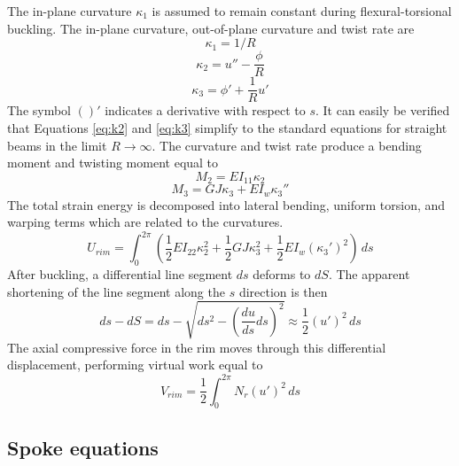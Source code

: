 \documentclass{bmd2016p}
\begin{document}
The in-plane curvature $\kappa_1$ is assumed to remain constant during flexural-torsional buckling. The in-plane curvature, out-of-plane curvature and twist rate are
	\begin{equation}\label{eq:k1}
	\kappa_1 = 1/R
	\end{equation}
	\begin{equation}\label{eq:k2}
	\kappa_2 = u'' - \frac{\phi}{R}
	\end{equation}
	\begin{equation}\label{eq:k3}
	\kappa_3 = \phi' + \frac{1}{R} u'
	\end{equation}
The symbol $()'$ indicates a derivative with respect to $s$. It can easily be verified that Equations \ref{eq:k2} and \ref{eq:k3} simplify to the standard equations for straight beams in the limit $R\rightarrow \infty$. The curvature and twist rate produce a bending moment and twisting moment equal to
	\begin{equation}\label{eq:M2}
	M_2 = EI_{11} \kappa_2
	\end{equation}
	\begin{equation}\label{eq:M3}
	M_3 = GJ \kappa_3 + EI_w \kappa_3''
	\end{equation}
The total strain energy is decomposed into lateral bending, uniform torsion, and warping terms which are related to the curvatures.
	\begin{equation}\label{eq:Urim}
	U_{rim} = \int_0^{2\pi} \left( \frac{1}{2} EI_{22} \kappa_2^2 + \frac{1}{2} GJ \kappa_3^2 + \frac{1}{2} EI_w (\kappa_3')^2 \right)\, ds
	\end{equation}
After buckling, a differential line segment $ds$ deforms to $dS$. The apparent shortening of the line segment along the $s$ direction is then
	\begin{equation}\label{eq:ds}
	ds - dS = ds - \sqrt{ds^2 - \left(\frac{du}{ds}ds\right)^2} \approx \frac{1}{2} (u')^2 \, ds
	\end{equation}
The axial compressive force in the rim moves through this differential displacement, performing virtual work equal to
	\begin{equation}\label{eq:Vrim}
	V_{rim} = \frac{1}{2} \int_0^{2\pi} N_r (u')^2 \, ds
	\end{equation}


\subsection{Spoke equations}
\end{document}
